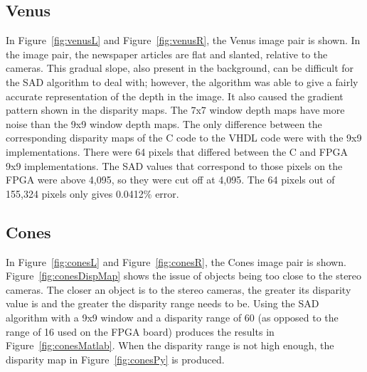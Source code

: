 

\subsection{Venus}
\label{sec:venus}

In Figure~\ref{fig:venusL} and Figure~\ref{fig:venusR}, the Venus image pair is shown. In the image pair, the newspaper articles are flat and slanted, relative to the cameras. This gradual slope, also present in the background, can be difficult for the SAD algorithm to deal with; however, the algorithm was able to give a fairly accurate representation of the depth in the image. It also caused the gradient pattern shown in the disparity maps. The 7x7 window depth maps have more noise than the 9x9 window depth maps. The only difference between the corresponding disparity maps of the C code to the VHDL code were with the 9x9 implementations. There were 64 pixels that differed between the C and FPGA 9x9 implementations. The SAD values that correspond to those pixels on the FPGA were above 4,095, so they were cut off at 4,095. The 64 pixels out of 155,324 pixels only gives 0.0412\% error.


\subsection{Cones}
\label{sec:cones}

In Figure~\ref{fig:conesL} and Figure~\ref{fig:conesR}, the Cones image pair is shown. Figure~\ref{fig:conesDispMap} shows the issue of objects being too close to the stereo cameras. The closer an object is to the stereo cameras, the greater its disparity value is and the greater the disparity range needs to be. Using the SAD algorithm with a 9x9 window and a disparity range of 60 (as opposed to the range of 16 used on the FPGA board) produces the results in Figure~\ref{fig:conesMatlab}. When the disparity range is not high enough, the disparity map in Figure~\ref{fig:conesPy} is produced.



